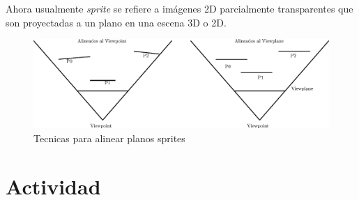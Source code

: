Ahora usualmente \emph{sprite} se refiere a imágenes 2D parcialmente transparentes que son proyectadas a un plano en una escena 3D o 2D.
\begin{figure}[H]
\centering
\includegraphics[width=0.9\linewidth]{semana3/bills.eps} 
\caption{Tecnicas para alinear planos sprites}
\end{figure}

\section{Actividad}
